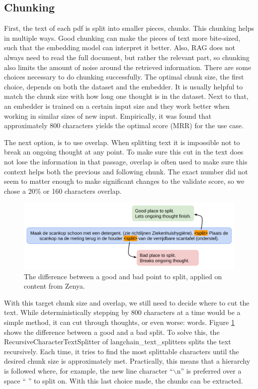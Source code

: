\subsection{Chunking}
First, the text of each pdf is split into smaller pieces, chunks. This chunking helps in multiple ways. Good chunking can make the pieces of text more bite-sized, such that the embedding model can interpret it better. Also, RAG does not always need to read the full document, but rather the relevant part, so chunking also limits the amount of noise around the retrieved information. There are some choices necessary to do chunking successfully. The optimal chunk size, the first choice, depends on both the dataset and the embedder. It is usually helpful to match the chunk size with how long one thought is in the dataset. Next to that, an embedder is trained on a certain input size and they work better when working in similar sizes of new input. Empirically, it was found that approximately 800 characters yields the optimal score (MRR) for the use case. 

The next option, is to use overlap. When splitting text it is impossible not to break an ongoing thought at any point. To make sure this cut in the text does not lose the information in that passage, overlap is often used to make sure this context helps both the previous and following chunk. The exact number did not seem to matter enough to make significant changes to the validate score, so we chose a 20\% or 160 characters overlap.

\begin{figure}[h]
    \captionsetup{justification=centering}
    \centerline{\includegraphics[width=1\linewidth]{fig/good_split_bad_split.png}}
    \caption{The difference between a good and bad point to split, applied on content from Zenya.}
    \label{fig:good_split_bad_split}
\end{figure}

With this target chunk size and overlap, we still need to decide where to cut the text. While deterministically stepping by 800 characters at a time would be a simple method, it can cut through thoughts, or even worse: words. Figure \ref{fig:good_split_bad_split} shows the difference between a good and a bad split. To solve this, the RecursiveCharacterTextSplitter of langchain\_text\_splitters \cite{langchain2025recursivecharactertextsplitter} splits the text recursively. Each time, it tries to find the most splittable characters until the desired chunk size is approximately met. Practically, this means that a hierarchy is followed where, for example, the new line character ``$\backslash$n'' is preferred over a space `` '' to split on. With this last choice made, the chunks can be extracted.

